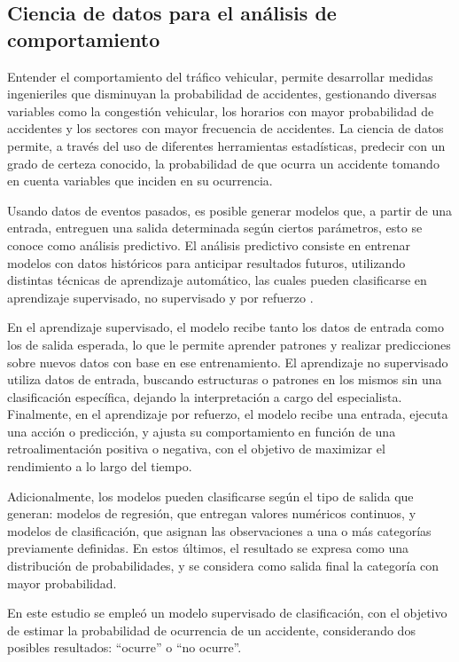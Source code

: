 \documentclass[12pt]{article}
\begin{document}
\subsection{Ciencia de datos para el análisis de comportamiento}

Entender el comportamiento del tráfico vehicular, permite desarrollar medidas ingenieriles que disminuyan la probabilidad de accidentes, gestionando diversas variables como la congestión vehicular, los horarios con mayor probabilidad de accidentes y los sectores con mayor frecuencia de accidentes. La ciencia de datos permite, a través del uso de diferentes herramientas estadísticas, predecir con un grado de certeza conocido, la probabilidad de que ocurra un accidente tomando en cuenta variables que inciden en su ocurrencia.

Usando datos de eventos pasados, es posible generar modelos que, a partir de una entrada, entreguen una salida determinada según ciertos parámetros, esto se conoce como análisis predictivo. El análisis predictivo consiste en entrenar modelos con datos históricos para anticipar resultados futuros, utilizando distintas técnicas de aprendizaje automático, las cuales pueden clasificarse en aprendizaje supervisado, no supervisado y por refuerzo \parencite{murphy2012machine, geron2019hands, bishop2006pattern}.

En el aprendizaje supervisado, el modelo recibe tanto los datos de entrada como los de salida esperada, lo que le permite aprender patrones y realizar predicciones sobre nuevos datos con base en ese entrenamiento. El aprendizaje no supervisado utiliza datos de entrada, buscando estructuras o patrones en los mismos sin una clasificación específica, dejando la interpretación a cargo del especialista. Finalmente, en el aprendizaje por refuerzo, el modelo recibe una entrada, ejecuta una acción o predicción, y ajusta su comportamiento en función de una retroalimentación positiva o negativa, con el objetivo de maximizar el rendimiento a lo largo del tiempo.

Adicionalmente, los modelos pueden clasificarse según el tipo de salida que generan: modelos de regresión, que entregan valores numéricos continuos, y modelos de clasificación, que asignan las observaciones a una o más categorías previamente definidas. En estos últimos, el resultado se expresa como una distribución de probabilidades, y se considera como salida final la categoría con mayor probabilidad.

En este estudio se empleó un modelo supervisado de clasificación, con el objetivo de estimar la probabilidad de ocurrencia de un accidente, considerando dos posibles resultados: “ocurre” o “no ocurre”.
\end{document}
